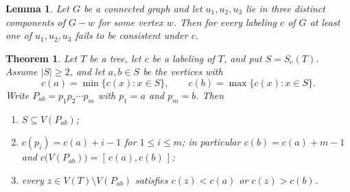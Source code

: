 \documentclass[10pt,a4paper]{amsart}
\newtheorem{lemma}{Lemma}
\newtheorem{theorem}{Theorem}
\begin{document}
\begin{lemma}
\label{lem:threebranch}
Let $G$ be a connected graph and let $u_1,u_2,u_3$ lie in three distinct
components of $G-w$ for some vertex $w$. Then for every labeling $c$ of $G$ at
least one of $u_1,u_2,u_3$ fails to be consistent under $c$.
\end{lemma}

\begin{theorem}
\label{thm:path}
Let $T$ be a tree, let $c$ be a labeling of $T$, and put $S=S_c(T)$. Assume
$|S|\ge2$, and let $a,b\in S$ be the vertices with
\[
  c(a)=\min\{c(x):x\in S\},\qquad c(b)=\max\{c(x):x\in S\}.
\]
Write $P_{ab}=p_1p_2\cdots p_m$ with $p_1=a$ and $p_m=b$. Then
\begin{enumerate}
\item[\textup{(i)}] $S\subseteq V(P_{ab})$;
\item[\textup{(ii)}] $c(p_i)=c(a)+i-1$ for $1\le i\le m$; in particular
$c(b)=c(a)+m-1$ and $c\bigl(V(P_{ab})\bigr)=[\,c(a),c(b)\,]$;
\item[\textup{(iii)}] every $z\in V(T)\setminus V(P_{ab})$ satisfies
$c(z)<c(a)$ or $c(z)>c(b)$.
\end{enumerate}
\end{theorem}
\end{document}
